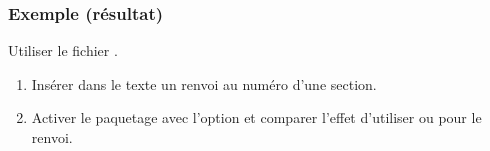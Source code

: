 \begin{frame}
  \frametitle{Exemple (résultat)}

\end{frame}

\begin{exercice}
  Utiliser le fichier .
  \begin{enumerate}
  \item Insérer dans le texte un renvoi au numéro d'une section.
  \item Activer le paquetage  avec l'option
     et comparer l'effet d'utiliser  ou
     pour le renvoi.
  \end{enumerate}
\end{exercice}


